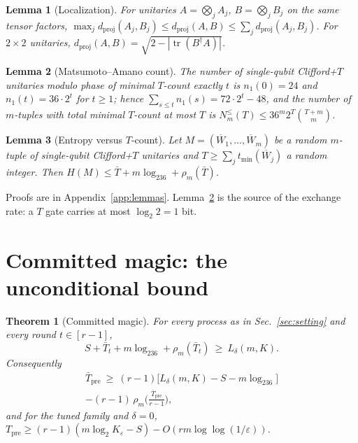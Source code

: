 \documentclass[aps,prx,twocolumn,superscriptaddress,nofootinbib,longbibliography]{revtex4-2}
\theoremstyle{plain}
\newtheorem{theorem}{Theorem}
\newtheorem{lemma}{Lemma}
\theoremstyle{definition}
\theoremstyle{remark}
\newcommand{\dproj}{d_{\mathrm{proj}}}
\newcommand{\Tpre}{T_{\mathrm{pre}}}
\newcommand{\tr}{\operatorname{tr}}
\begin{document}
\begin{lemma}[Localization]\label{lem:loc}
For unitaries $A=\bigotimes_jA_j$, $B=\bigotimes_jB_j$ on the same tensor factors,
$\max_j\dproj(A_j,B_j)\le\dproj(A,B)\le\sum_j\dproj(A_j,B_j)$. For $2\times2$ unitaries, $\dproj(A,B)=\sqrt{2-|\tr(B^\dagger A)|}$.
\end{lemma}

\begin{lemma}[Matsumoto--Amano count]\label{lem:MA}
The number of single-qubit Clifford+$T$ unitaries modulo phase of minimal $T$-count exactly $t$ is $n_1(0)=24$ and $n_1(t)=36\cdot2^t$ for $t\ge1$; hence $\sum_{s\le t}n_1(s)=72\cdot2^t-48$, and the number of $m$-tuples with total minimal $T$-count at most $T$ is $N^{\le}_m(T)\le36^m2^T\binom{T+m}{m}$.
\end{lemma}

\begin{lemma}[Entropy versus $T$-count]\label{lem:ent}
Let $M=(\overline W_1,\dots,\overline W_m)$ be a random $m$-tuple of single-qubit Clifford+$T$ unitaries and $T\ge\sum_jt_{\min}(\overline W_j)$ a random integer. Then $H(M)\le\bar T+m\log_236+\rho_m(\bar T)$.
\end{lemma}
Proofs are in Appendix~\ref{app:lemmas}. Lemma~\ref{lem:MA} is the source of the exchange rate: a $T$ gate carries at most $\log_2 2=1$ bit.

\section{Committed magic: the unconditional bound}

\begin{theorem}[Committed magic]\label{thm:main1}
For every process as in Sec.~\ref{sec:setting} and every round $t\in[r-1]$,
\begin{equation}\label{eq:main1}
S+\bar T_t+m\log_236+\rho_m(\bar T_t)\ \ge\ L_\delta(m,K).
\end{equation}
Consequently
\begin{multline}
\bar\Tpre\ \ge\ (r-1)\big[L_\delta(m,K)-S-m\log_236\big]\\-(r-1)\,\rho_m\!\Big(\frac{\bar\Tpre}{r-1}\Big),
\end{multline}
and for the tuned family and $\delta=0$, $\Tpre\ge(r-1)(m\log_2K_\varepsilon-S)-O(rm\log\log(1/\varepsilon))$.
\end{theorem}
\end{document}
